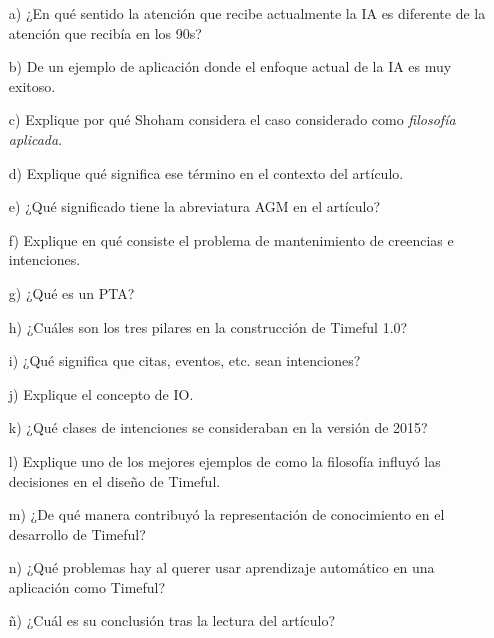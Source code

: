 \documentclass[11pt, letterpaper]{article}
\begin{document}
	\begin{enumerate}
		\item[a)] ¿En qué sentido la atención que recibe actualmente la IA es diferente de la atención que recibía en los 90s?
		
		\item[b)] De un ejemplo de aplicación donde el enfoque actual de la IA es muy exitoso.
		
		
		\item[c)]  Explique por qué Shoham considera el caso considerado como \textit{filosofía aplicada}.
		
		
		\item[d)] Explique qué significa ese término en el contexto del artículo.
		
		
		\item[e)] ¿Qué significado tiene la abreviatura AGM en el artículo?
		
		
		\item[f)]  Explique en qué consiste el problema de mantenimiento de creencias e intenciones.
		
		\item[g)] ¿Qué es un PTA?
		
		\item[h)] ¿Cuáles son los tres pilares en la construcción de Timeful 1.0?
		
		
		\item[i)] ¿Qué significa que citas, eventos, etc. sean intenciones?
		
		\item[j)] Explique el concepto de IO.
		
		\item[k)] ¿Qué clases de intenciones se consideraban en la versión de 2015?
		
		\item[l)] Explique uno de los mejores ejemplos de como la filosofía influyó las decisiones en el diseño de Timeful.
		
		\item[m)]  ¿De qué manera contribuyó la representación de conocimiento en el desarrollo de Timeful?
		
		\item[n)] ¿Qué problemas hay al querer usar aprendizaje automático en una aplicación como Timeful?
		
		\item[ñ)] ¿Cuál es su conclusión tras la lectura del artículo?
		
	\end{enumerate}
	
\end{document}

